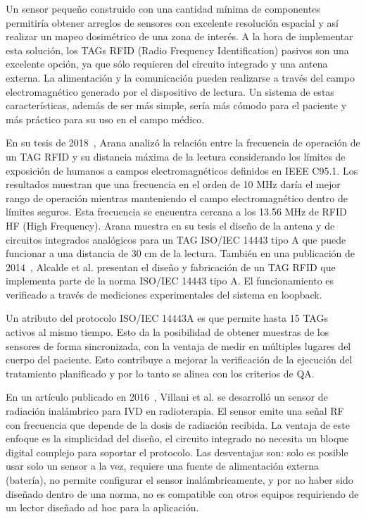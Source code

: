 \documentclass[a4paper, twoside, 11pt]{report}
\begin{document}
Un sensor pequeño construido con una cantidad mínima de componentes permitiría obtener arreglos de sensores con excelente resolución espacial y así realizar un mapeo dosimétrico de una zona de interés. A la hora de implementar esta solución, los TAGs RFID (Radio Frequency Identification) pasivos son una excelente opción, ya que sólo requieren del circuito integrado y una antena externa. La alimentación y la comunicación pueden realizarse a través del campo electromagnético generado por el dispositivo de lectura. Un sistema de estas características, además de ser más simple, sería más cómodo para el paciente y más práctico para su uso en el campo médico.

En su tesis de 2018~\cite{Arana_thesis}, Arana analizó la relación entre la frecuencia de operación de un TAG RFID y su distancia máxima de la lectura considerando los límites de exposición de humanos a campos electromagnéticos definidos en IEEE C95.1. Los resultados muestran que una frecuencia en el orden de 10 MHz daría el mejor rango de operación mientras manteniendo el campo electromagnético dentro de límites seguros. Esta frecuencia se encuentra cercana a los 13.56 MHz de RFID HF (High Frequency). Arana muestra en su tesis el diseño de la antena y de circuitos integrados analógicos para un TAG ISO/IEC 14443 tipo A que puede funcionar a una distancia de 30 cm de la lectura. También en una publicación de 2014~\cite{fabricio_eamta}, Alcalde et al. presentan el diseño y fabricación de un TAG RFID que implementa parte de la norma ISO/IEC 14443 tipo A. El funcionamiento es verificado a través de mediciones experimentales del sistema en loopback.

Un atributo del protocolo ISO/IEC 14443A es que permite hasta 15 TAGs activos al mismo tiempo. Esto da la posibilidad de obtener muestras de los sensores de forma sincronizada, con la ventaja de medir en múltiples lugares del cuerpo del paciente. Esto contribuye a mejorar la verificación de la ejecución del tratamiento planificado y por lo tanto se alinea con los criterios de QA.

En un artículo publicado en 2016~\cite{monolithic_180nm}, Villani et al. se desarrolló un sensor de radiación inalámbrico para IVD en radioterapia. El sensor emite una señal RF con frecuencia que depende de la dosis de radiación recibida. La ventaja de este enfoque es la simplicidad del diseño, el circuito integrado no necesita un bloque digital complejo para soportar el protocolo. Las desventajas son: solo es posible usar solo un sensor a la vez, requiere una fuente de alimentación externa (batería), no permite configurar el sensor inalámbricamente, y por no haber sido diseñado dentro de una norma, no es compatible con otros equipos requiriendo de un lector diseñado ad hoc para la aplicación.
\end{document}
